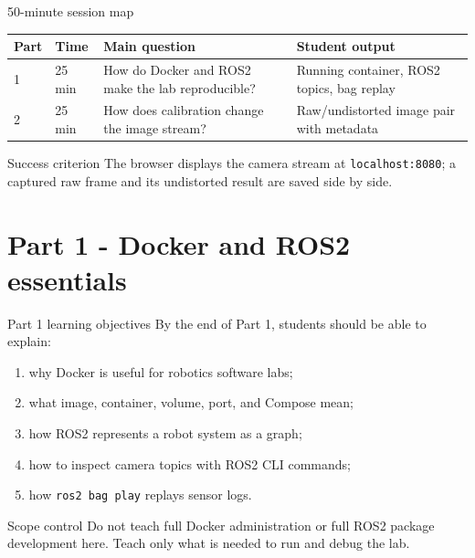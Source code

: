 \documentclass[aspectratio=169,10pt]{beamer}
\newcommand{\code}[1]{\texttt{#1}}
\begin{document}
\begin{frame}{50-minute session map}
  \begin{tabularx}{\textwidth}{@{}l l X X@{}}
    \toprule
    Part & Time & Main question & Student output \\
    \midrule
    1 & 25 min & How do Docker and ROS2 make the lab reproducible? & Running container, ROS2 topics, bag replay \\
    2 & 25 min & How does calibration change the image stream? & Raw/undistorted image pair with metadata \\
    \bottomrule
  \end{tabularx}
  \vspace{1.0em}
  \begin{block}{Success criterion}
    The browser displays the camera stream at \code{localhost:8080}; a captured raw frame and its undistorted result are saved side by side.
  \end{block}
\end{frame}

\section{Part 1 - Docker and ROS2 essentials}

\begin{frame}{Part 1 learning objectives}
  By the end of Part 1, students should be able to explain:
  \begin{enumerate}
    \item why Docker is useful for robotics software labs;
    \item what image, container, volume, port, and Compose mean;
    \item how ROS2 represents a robot system as a graph;
    \item how to inspect camera topics with ROS2 CLI commands;
    \item how \code{ros2 bag play} replays sensor logs.
  \end{enumerate}
  \vspace{0.5em}
  \begin{alertblock}{Scope control}
    Do not teach full Docker administration or full ROS2 package development here. Teach only what is needed to run and debug the lab.
  \end{alertblock}
\end{frame}
\end{document}
